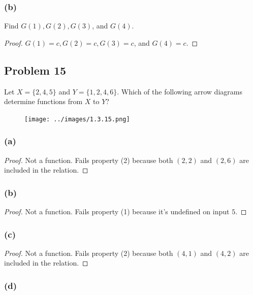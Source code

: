 \documentclass[14pt]{extarticle}
\begin{document}
\subsubsection{(b)}
Find $G(1), G(2), G(3)$, and $G(4)$.

\begin{proof}
    $G(1) = c, G(2) = c, G(3) = c$, and $G(4) = c$.
\end{proof}

\subsection{Problem 15}
Let $X = \{2, 4, 5\}$ and $Y = \{1, 2, 4, 6\}$. Which of the following arrow
diagrams determine functions from $X$ to $Y$?

\begin{figure}[ht!]
    \centering
    \texttt{[image: ../images/1.3.15.png]}
\end{figure}

\subsubsection{(a)}

\begin{proof}
    Not a function. Fails property (2) because both $(2, 2)$ and $(2, 6)$ are
    included in the relation.
\end{proof}

\subsubsection{(b)}

\begin{proof}
    Not a function. Fails property (1) because it's undefined on input $5$.
\end{proof}

\subsubsection{(c)}

\begin{proof}
    Not a function. Fails property (2) because both $(4, 1)$ and $(4, 2)$ are
    included in the relation.
\end{proof}

\subsubsection{(d)}
\end{document}
